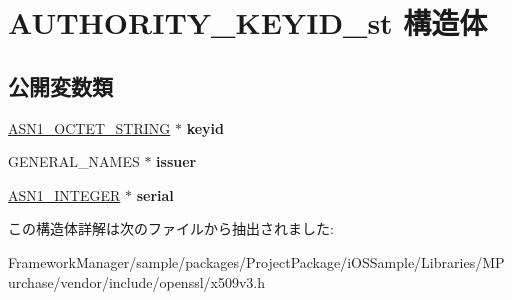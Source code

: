 \hypertarget{struct_a_u_t_h_o_r_i_t_y___k_e_y_i_d__st}{}\section{A\+U\+T\+H\+O\+R\+I\+T\+Y\+\_\+\+K\+E\+Y\+I\+D\+\_\+st 構造体}
\label{struct_a_u_t_h_o_r_i_t_y___k_e_y_i_d__st}
\subsection*{公開変数類}
\begin{DoxyCompactItemize}
\item 
\hypertarget{struct_a_u_t_h_o_r_i_t_y___k_e_y_i_d__st_ad9aea22a1fc62bcf0669f7feba4e38a7}{}\hyperlink{structasn1__string__st}{A\+S\+N1\+\_\+\+O\+C\+T\+E\+T\+\_\+\+S\+T\+R\+I\+N\+G} $\ast$ {\bfseries keyid}\label{struct_a_u_t_h_o_r_i_t_y___k_e_y_i_d__st_ad9aea22a1fc62bcf0669f7feba4e38a7}

\item 
\hypertarget{struct_a_u_t_h_o_r_i_t_y___k_e_y_i_d__st_a3a750d3a2a795e1a0dfb98f0e16bf339}{}G\+E\+N\+E\+R\+A\+L\+\_\+\+N\+A\+M\+E\+S $\ast$ {\bfseries issuer}\label{struct_a_u_t_h_o_r_i_t_y___k_e_y_i_d__st_a3a750d3a2a795e1a0dfb98f0e16bf339}

\item 
\hypertarget{struct_a_u_t_h_o_r_i_t_y___k_e_y_i_d__st_a266ae5a8b48cee3727995cf791bc7d8c}{}\hyperlink{structasn1__string__st}{A\+S\+N1\+\_\+\+I\+N\+T\+E\+G\+E\+R} $\ast$ {\bfseries serial}\label{struct_a_u_t_h_o_r_i_t_y___k_e_y_i_d__st_a266ae5a8b48cee3727995cf791bc7d8c}

\end{DoxyCompactItemize}


この構造体詳解は次のファイルから抽出されました\+:\begin{DoxyCompactItemize}
\item 
Framework\+Manager/sample/packages/\+Project\+Package/i\+O\+S\+Sample/\+Libraries/\+M\+Purchase/vendor/include/openssl/x509v3.\+h\end{DoxyCompactItemize}
